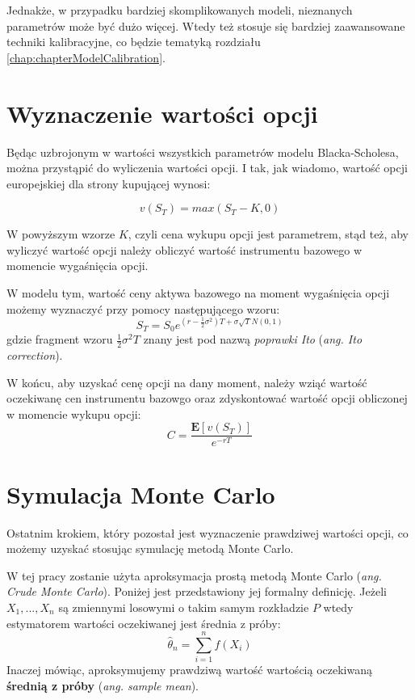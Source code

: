 \documentclass{pracamgr}
\begin{document}
Jednakże, w przypadku bardziej skomplikowanych modeli, nieznanych parametrów może być dużo więcej. Wtedy też 
stosuje się bardziej zaawansowane techniki kalibracyjne, co będzie tematyką rozdziału \ref{chap:chapterModelCalibration}.


\section{Wyznaczenie wartości opcji}

Będąc uzbrojonym w wartości wszystkich parametrów modelu Blacka-Scholesa, można przystąpić
do wyliczenia wartości opcji. I tak, jak wiadomo, wartość opcji europejskiej dla strony kupującej 
wynosi:

\begin{equation}
  v(S_T) = max(S_T-K, 0)
\end{equation}

W powyższym wzorze $K$, czyli cena wykupu opcji jest parametrem, stąd też,  aby wyliczyć wartość opcji należy obliczyć wartość instrumentu bazowego w momencie wygaśnięcia opcji.

W modelu tym, wartość ceny aktywa bazowego na moment wygaśnięcia opcji możemy wyznaczyć przy pomocy następującego wzoru:
\begin{equation}
  S_T = S_0 e^{(r - \frac{1}{2} \sigma^2)T+\sigma \sqrt{T} N(0,1)}
\end{equation}
gdzie fragment wzoru $\frac{1}{2} \sigma^2 T$ znany jest pod nazwą \textit{poprawki Ito} (\textit{ang. Ito correction}).

W końcu, aby uzyskać cenę opcji na dany moment, należy wziąć wartość oczekiwanę cen instrumentu bazowgo oraz zdyskontować wartość opcji obliczonej w momencie wykupu opcji:
\begin{equation}
  C = \frac{\mathbf{E}[v(S_T)]}{e^{-rT}}
\end{equation}

\section{Symulacja Monte Carlo}

Ostatnim krokiem, który pozostał jest wyznaczenie prawdziwej wartości opcji, co możemy uzyskać 
stosując symulację metodą Monte Carlo.

W tej pracy zostanie użyta aproksymacja prostą metodą Monte Carlo (\textit{ang. Crude Monte Carlo}). 
Poniżej jest przedstawiony jej formalny definicję.
Jeżeli $X_1, ..., X_n$ są zmiennymi losowymi o takim samym rozkładzie $P$ wtedy estymatorem wartości
oczekiwanej jest średnia z próby:
\begin{equation}
  \hat{\theta}_n = \sum_{i=1}^n f(X_i) 
\end{equation}
Inaczej mówiąc, aproksymujemy prawdziwą wartość wartością oczekiwaną \textbf{średnią z próby} (\textit{ang. sample mean}).
\end{document}
